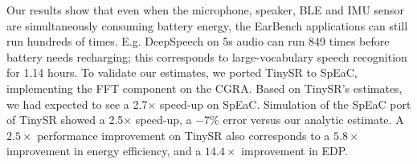 Our results show that even when the microphone, speaker, BLE and IMU sensor are
simultaneously consuming battery energy, the EarBench applications can still
run hundreds of times. E.g. DeepSpeech on 5s audio can run 849 times before
battery needs recharging; this corresponds to large-vocabulary speech
recognition for 1.14 hours. To validate our estimates, we ported TinySR to
SpEaC, implementing the FFT component on the CGRA. Based on TinySR’s estimates,
we had expected to see a 2.7× speed-up on SpEaC. Simulation of the SpEaC port
of TinySR showed a 2.5× speed-up, a −7\% error versus our analytic estimate. A
\(2.5\times\) performance improvement on TinySR also corresponds to a
\(5.8\times\) improvement in energy efficiency, and a \(14.4\times\)
improvement in EDP.


